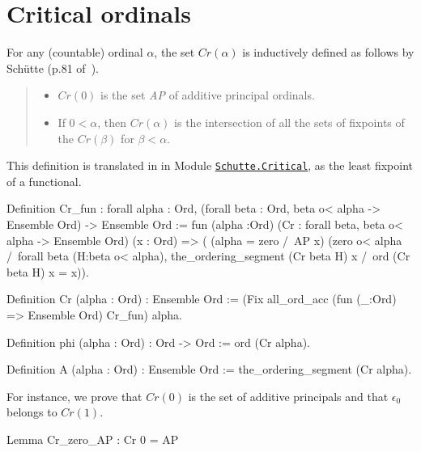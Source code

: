 {\section{Critical ordinals}


For any  (countable) ordinal $\alpha$, the set $\textit{Cr}(\alpha)$ is inductively defined 
as follows by Schütte (p.81 of~\cite{schutte}).

\begin{quote}
  \begin{itemize}
  \item $\textit{Cr}(0)$ is the set \textit{AP} of additive principal ordinals.
  \item If $0<\alpha$, then $\textit{Cr}(\alpha)$ is the intersection of all the sets of fixpoints of the $\textit{Cr}(\beta)$ for $\beta<\alpha$.
  \end{itemize}
\end{quote}

This definition is translated in \coq{} in 
Module \href{../src/html/hydras.Schutte.Critical.html}%
{\texttt{Schutte.Critical}}, as the least fixpoint of a functional. 


\begin{Coqsrc}
Definition Cr_fun : forall alpha : Ord,
       (forall beta : Ord, beta o< alpha -> Ensemble Ord) ->
        Ensemble Ord 
:= 
   fun (alpha :Ord)
        (Cr : forall beta, 
                beta o< alpha -> Ensemble Ord) 
        (x : Ord) => (
       (alpha = zero /\ AP x) \/
       (zero o< alpha /\
        forall beta (H:beta o< alpha),
          the_ordering_segment (Cr beta H) x /\ ord (Cr  beta H) x = x)).

Definition Cr (alpha : Ord) : Ensemble Ord := 
    (Fix  all_ord_acc (fun (_:Ord) => Ensemble Ord) Cr_fun) alpha.
\end{Coqsrc}


\begin{Coqsrc}
Definition phi (alpha : Ord) : Ord -> Ord 
    :=  ord (Cr alpha).

Definition A (alpha : Ord) : Ensemble Ord :=
  the_ordering_segment (Cr alpha).
\end{Coqsrc}

For instance,  we prove that $\textit{Cr}(0)$ is the set of additive principals and that $\epsilon_0$
belongs to $\textit{Cr}(1)$.

\begin{Coqsrc}
Lemma Cr_zero_AP :  Cr 0 = AP


\end{Coqsrc}}
